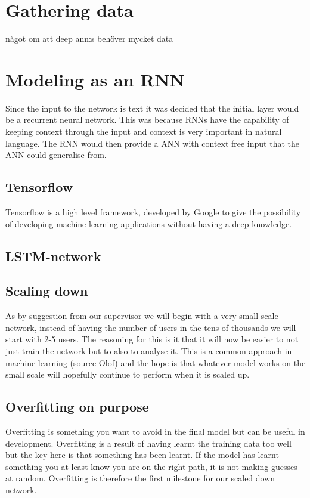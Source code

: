 \section{Gathering data}
något om att deep ann:s behöver mycket data %
\section{Modeling as an RNN}
Since the input to the network is text it was decided that the initial layer would be a recurrent neural network. This was because RNNs have the capability of keeping context through the input and context is very important in natural language. The RNN would then provide a ANN with context free input that the ANN could generalise from.
\subsection{Tensorflow}%
Tensorflow is a high level framework, developed by Google to give the possibility of developing machine learning applications without having a deep knowledge. %
\subsection{LSTM-network}
\subsection{Scaling down}
As by suggestion from our supervisor we will begin with a very small scale network, instead of having the number of users in the tens of thousands we will start with 2-5 users. The reasoning for this is it that it will now be easier to not just train the network but to also to analyse it. This is a common approach in machine learning (source Olof) and the hope is that whatever model works on the small scale will hopefully continue to perform when it is scaled up.    
\subsection{Overfitting on purpose}
Overfitting is something you want to avoid in the final model but can be useful in development. Overfitting is a result of having learnt the training data too well but the key here is that something has been learnt. If the model has learnt something you at least know you are on the right path, it is not making guesses at random. Overfitting is therefore the first milestone for our scaled down network. 

